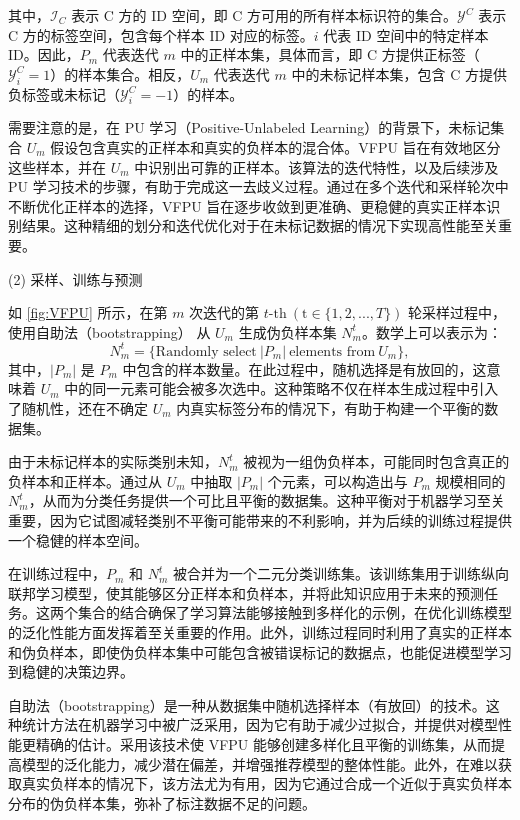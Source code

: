 其中，${{\mathsf{\mathcal{I}}}_{C}}$ 表示 C 方的 ID 空间，即 C 方可用的所有样本标识符的集合。${{\mathsf{\mathcal{Y}}}^{C}}$ 表示 C 方的标签空间，包含每个样本 ID 对应的标签。$i$ 代表 ID 空间中的特定样本 ID。因此，${{P}_{m}}$ 代表迭代 $m$ 中的正样本集，具体而言，即 C 方提供正标签（$\mathsf{\mathcal{Y}}_{i}^{C}=1$）的样本集合。相反，${{U}_{m}}$ 代表迭代 $m$ 中的未标记样本集，包含 C 方提供负标签或未标记（$\mathsf{\mathcal{Y}}_{i}^{C}=-1$）的样本。

需要注意的是，在 PU 学习（Positive-Unlabeled Learning）的背景下，未标记集合 ${{U}_{m}}$ 假设包含真实的正样本和真实的负样本的混合体。VFPU 旨在有效地区分这些样本，并在 ${{U}_{m}}$ 中识别出可靠的正样本。该算法的迭代特性，以及后续涉及 PU 学习技术的步骤，有助于完成这一去歧义过程。通过在多个迭代和采样轮次中不断优化正样本的选择，VFPU 旨在逐步收敛到更准确、更稳健的真实正样本识别结果。这种精细的划分和迭代优化对于在未标记数据的情况下实现高性能至关重要。

(2) 采样、训练与预测

如 \ref{fig:VFPU} 所示，在第 $m$ 次迭代的第 $t\text{-th} \ (\text{t}\in \{1,2,...,T\})$ 轮采样过程中，使用自助法（bootstrapping）\citep{mordelet2014bagging} 从 $U_{m}$ 生成伪负样本集 $N_{m}^{t}$。数学上可以表示为：
\begin{equation}
	N_{m}^{t}=\{ \text{Randomly select} \ |P_{m}| \ \text{elements from} \ U_{m} \},
\end{equation}
其中，$|P_{m}|$ 是 $P_{m}$ 中包含的样本数量。在此过程中，随机选择是有放回的，这意味着 $U_{m}$ 中的同一元素可能会被多次选中。这种策略不仅在样本生成过程中引入了随机性，还在不确定 $U_{m}$ 内真实标签分布的情况下，有助于构建一个平衡的数据集。

由于未标记样本的实际类别未知，$N_{m}^{t}$ 被视为一组伪负样本，可能同时包含真正的负样本和正样本。通过从 $U_{m}$ 中抽取 $|P_{m}|$ 个元素，可以构造出与 $P_{m}$ 规模相同的 $N_{m}^{t}$，从而为分类任务提供一个可比且平衡的数据集。这种平衡对于机器学习至关重要，因为它试图减轻类别不平衡可能带来的不利影响，并为后续的训练过程提供一个稳健的样本空间。

在训练过程中，$P_{m}$ 和 $N_{m}^{t}$ 被合并为一个二元分类训练集。该训练集用于训练纵向联邦学习模型，使其能够区分正样本和负样本，并将此知识应用于未来的预测任务。这两个集合的结合确保了学习算法能够接触到多样化的示例，在优化训练模型的泛化性能方面发挥着至关重要的作用。此外，训练过程同时利用了真实的正样本和伪负样本，即使伪负样本集中可能包含被错误标记的数据点，也能促进模型学习到稳健的决策边界。

自助法（bootstrapping）是一种从数据集中随机选择样本（有放回）的技术。这种统计方法在机器学习中被广泛采用，因为它有助于减少过拟合，并提供对模型性能更精确的估计。采用该技术使 VFPU 能够创建多样化且平衡的训练集，从而提高模型的泛化能力，减少潜在偏差，并增强推荐模型的整体性能。此外，在难以获取真实负样本的情况下，该方法尤为有用，因为它通过合成一个近似于真实负样本分布的伪负样本集，弥补了标注数据不足的问题。

